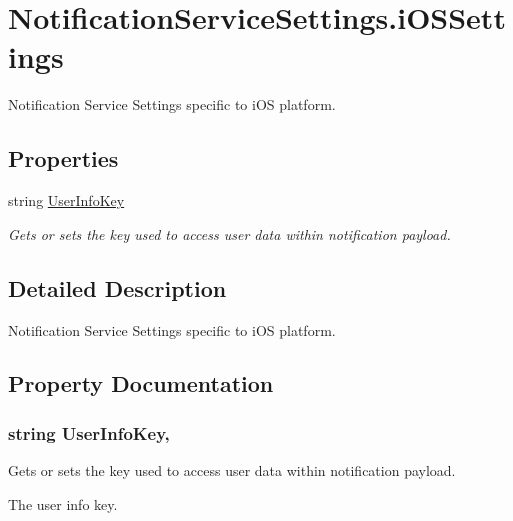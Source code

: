 \hypertarget{class_voxel_busters_1_1_native_plugins_1_1_notification_service_settings_1_1i_o_s_settings}{}\section{Notification\+Service\+Settings.\+i\+O\+S\+Settings}
\label{class_voxel_busters_1_1_native_plugins_1_1_notification_service_settings_1_1i_o_s_settings}


Notification Service Settings specific to i\+O\+S platform.  


\subsection*{Properties}
\begin{DoxyCompactItemize}
\item 
string \hyperlink{class_voxel_busters_1_1_native_plugins_1_1_notification_service_settings_1_1i_o_s_settings_ad699b1df7fea4928c313b2a6cf90a1a7}{User\+Info\+Key}
\begin{DoxyCompactList}\small\item\em Gets or sets the key used to access user data within notification payload. \end{DoxyCompactList}\end{DoxyCompactItemize}


\subsection{Detailed Description}
Notification Service Settings specific to i\+O\+S platform. 



\subsection{Property Documentation}
\hypertarget{class_voxel_busters_1_1_native_plugins_1_1_notification_service_settings_1_1i_o_s_settings_ad699b1df7fea4928c313b2a6cf90a1a7}{}
\subsubsection[{User\+Info\+Key}]{\setlength{\rightskip}{0pt plus 5cm}string User\+Info\+Key\hspace{0.3cm}{\ttfamily [get]}, {\ttfamily [set]}}\label{class_voxel_busters_1_1_native_plugins_1_1_notification_service_settings_1_1i_o_s_settings_ad699b1df7fea4928c313b2a6cf90a1a7}


Gets or sets the key used to access user data within notification payload. 

The user info key.